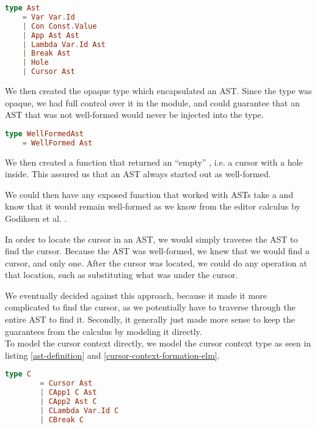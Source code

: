\begin{lstlisting}[language=elm,%
    gobble=0,%
    ]
type Ast
    = Var Var.Id
    | Con Const.Value
    | App Ast Ast
    | Lambda Var.Id Ast
    | Break Ast
    | Hole
    | Cursor Ast
\end{lstlisting}

We then created the opaque type  which encapsulated an
AST. Since the type was opaque, we had full control over it in the 
module, and could guarantee that an AST that was not well-formed would never be
injected into the  type.

\begin{lstlisting}[language=elm,%
    gobble=0,%
    ]
type WellFormedAst
    = WellFormed Ast
\end{lstlisting}

We then created a function that returned an ``empty'' ,
i.e. a cursor with a hole inside. This assured us that an AST always started out
as well-formed.

We could then have any exposed function that worked with ASTs take a
 and know that it would remain well-formed as we know from
the editor calculus by Godiksen et al. \pepm.

In order to locate the cursor in an AST, we would simply traverse the AST to
find the cursor. Because the AST was well-formed, we knew that we would find a
cursor, and only one. After the cursor was located, we could do any operation at
that location, such as substituting what was under the cursor.


We eventually decided against this approach, because it made it more complicated
to find the cursor, as we potentially have to traverse through the entire AST to
find it. Secondly, it generally just made more sense to keep the guarantees from
the calculus by modeling it directly. \\


To model the cursor context directly, we model the cursor context type as seen
in listing \ref{ast-definition} and \ref{cursor-context-formation-elm}.

\begin{lstlisting}[language=elm,%
                   label={cursor-context-formation-elm},%
                   gobble=4,%
                   caption={Formation rules (\ref{formationC2}) modeled in Elm},%
                   ]
    type C
        = Cursor Ast
        | CApp1 C Ast
        | CApp2 Ast C
        | CLambda Var.Id C
        | CBreak C
\end{lstlisting}


